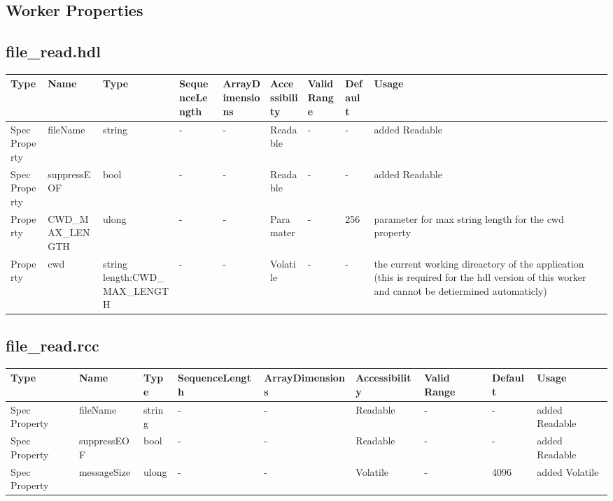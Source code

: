\documentclass{article}
\def\comp{file\_read}
\begin{document}
\begin{landscape}
	\section*{Worker Properties}
	\subsection*{\comp.hdl}
	\begin{scriptsize}
\begin{tabular}{|p{2cm}|p{2.75cm}|p{3.5cm}|p{2cm}|p{2cm}|p{2.25cm}|p{1.5cm}|p{1cm}|p{4cm}|}
			\hline
			\rowcolor{blue}
			Type     & Name                      & Type  & SequenceLength & ArrayDimensions & Accessibility       & Valid Range & Default & Usage                                      \\
			\hline
			Spec Property & fileName & string  & - & - & Readable & -  &- & added Readable
            \\
            \hline
            Spec Property & suppressEOF & bool  & - & - & Readable & -  &- & added Readable
            \\
            \hline
            Property & CWD\_MAX\_LENGTH & ulong  & - & - & Paramater & -  & 256 & parameter for max string length for the cwd property
            \\
            \hline
            Property & cwd & string length:CWD\_MAX\_LENGTH & - & - & Volatile & -  &- & the current working direactory of the application (this is required for the hdl version of this worker and cannot be detiermined automaticly)
            \\
            \hline
    \end{tabular}
	\end{scriptsize}

	\subsection*{\comp.rcc}
    \begin{scriptsize}
    \begin{tabular}{|p{2cm}|p{2.75cm}|p{1cm}|p{2.75cm}|p{2cm}|p{2.25cm}|p{2cm}|p{1cm}|p{5cm}|}
			\hline
			\rowcolor{blue}
			Type     & Name                      & Type  & SequenceLength & ArrayDimensions & Accessibility       & Valid Range & Default & Usage                                      \\
			\hline
			Spec Property & fileName & string  & - & - & Readable & -  &- & added Readable
            \\
            \hline
            Spec Property & suppressEOF & bool  & - & - & Readable & -  &- & added Readable
            \\
            \hline
            Spec Property & messageSize & ulong  & - & - &  Volatile & -  &4096 & added Volatile
            \\
            \hline
    \end{tabular}
	\end{scriptsize}


\end{landscape}
\end{document}
